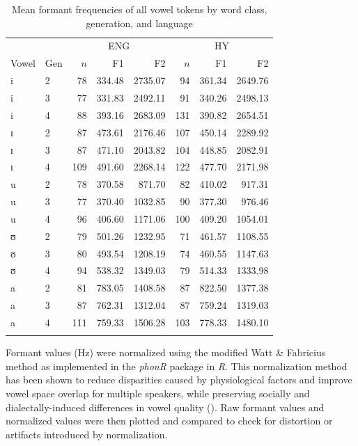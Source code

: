 \documentclass[output=paper]{langsci/langscibook}
\begin{document}
\begin{table}
\begin{tabular}{ll *{6}{r}}
\lsptoprule
	& & \multicolumn{3}{c}{ENG} & \multicolumn{3}{c}{HY}\\\cmidrule(lr){3-5}\cmidrule(lr){6-8}
{Vowel} & {Gen} & {$n$} & {F1} & {F2} & {$n$} & {F1} & {F2}\\
\midrule
i & 2 & 78 & 334.48 & 2735.07 & 94 & 361.34 & 2649.76\\
i & 3 & 77 & 331.83 & 2492.11 & 91 & 340.26 & 2498.13\\
i & 4 & 88 & 393.16 & 2683.09 & 131 & 390.82 & 2654.51\\
ɪ & 2 & 87 & 473.61 & 2176.46 & 107 & 450.14 & 2289.92\\
ɪ & 3 & 87 & 471.10 & 2043.82 & 104 & 448.85 & 2082.91\\
ɪ & 4 & 109 & 491.60 & 2268.14 & 122 & 477.70 & 2171.98\\
u & 2 & 78 & 370.58 & 871.70 & 82 & 410.02 & 917.31\\
u & 3 & 77 & 370.40 & 1032.85 & 90 & 377.30 & 976.46\\
u & 4 & 96 & 406.60 & 1171.06 & 100 & 409.20 & 1054.01\\
ʊ & 2 & 79 & 501.26 & 1232.95 & 71 & 461.57 & 1108.55\\
ʊ & 3 & 80 & 493.54 & 1208.19 & 74 & 460.55 & 1147.63\\
ʊ & 4 & 94 & 538.32 & 1349.03 & 79 & 514.33 & 1333.98\\
a & 2 & 81 & 783.05 & 1408.58 & 87 & 822.50 & 1377.38\\
a & 3 & 87 & 762.31 & 1312.04 & 87 & 759.24 & 1319.03\\
a & 4 & 111 & 759.33 & 1506.28 & 103 & 778.33 & 1480.10\\
\lspbottomrule
\end{tabular}
\caption{Mean formant frequencies of all vowel tokens by word class, generation, and language\label{tab:nove:2}}
\end{table}

Formant values (Hz) were normalized using the modified Watt \& Fabricius method as implemented in the \textit{phonR} package \citep{McCloy2016} in \textit{R}. This normalization method has been shown to reduce disparities caused by physiological factors and improve vowel space overlap for multiple speakers, while preserving socially and dialectally-induced differences in vowel quality (\citealt{WattFabricius2002, FabriciusEtAl2009}). Raw formant values and normalized values were then plotted and compared to check for distortion or artifacts introduced by normalization. 
\end{document}
